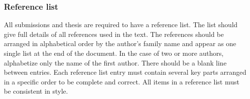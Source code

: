 \subsubsection{Reference list}

All submissions and thesis are required to have a reference list. The list should give full details of all references used in the text. The references should be arranged in alphabetical order by the author’s family name and appear as one single list at the end of the document. In the case of two or more authors, alphabetize only the name of the first author. There should be a blank line between entries. Each reference list entry must contain several key parts arranged in a specific order to be complete and correct. All items in a reference list must be consistent in style.